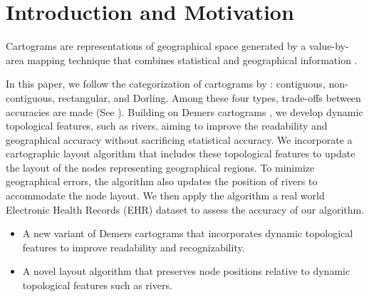 \section{Introduction and Motivation}

Cartograms are representations of geographical space generated by a value-by-area mapping technique that combines statistical and geographical information \cite{dent2009Cartography}. 

In this paper, we follow the categorization of cartograms by : contiguous, non-contiguous, rectangular, and Dorling. Among these four types, trade-offs between accuracies are made (See ). Building on Demers cartograms \cite{ian2002Cartogram}, we develop dynamic topological features, such as rivers, aiming to improve the readability and geographical accuracy without sacrificing statistical accuracy. We incorporate a cartographic layout algorithm that includes these topological features to update the layout of the nodes representing geographical regions. To minimize geographical errors, the algorithm also updates the position of rivers to accommodate the node layout. We then apply the algorithm a real world Electronic Health Records (EHR) dataset to assess the accuracy of our algorithm.


\begin{itemize}
    \item A new variant of Demers cartograms that incorporates dynamic topological features to improve readability and recognizability.
    \item A novel layout algorithm that preserves node positions relative to dynamic topological features such as rivers.
\end{itemize}